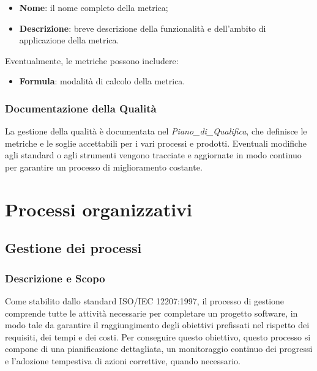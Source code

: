 \documentclass[10pt]{article}
\begin{document}
\begin{justify}
\begin{itemize}
    \item \textbf{Nome}: il nome completo della metrica;
    \item \textbf{Descrizione}: breve descrizione della funzionalità e dell'ambito di applicazione della metrica.
\end{itemize}

Eventualmente, le metriche possono includere:
\begin{itemize}
    \item \textbf{Formula}: modalità di calcolo della metrica.
\end{itemize}
    
    \subsubsection{Documentazione della Qualità}
    La gestione della qualità è documentata nel \textit{Piano\_di\_Qualifica}, che definisce le metriche e le soglie accettabili per i vari processi e prodotti. Eventuali modifiche agli standard o agli strumenti vengono tracciate e aggiornate in modo continuo per garantire un processo di miglioramento costante.

\newpage
\section{Processi organizzativi}
    \subsection{Gestione dei processi}

    \subsubsection{Descrizione e Scopo}
    Come stabilito dallo standard ISO/IEC 12207:1997, il processo di gestione comprende tutte le attività necessarie per completare un progetto software, in modo tale da garantire il raggiungimento degli obiettivi prefissati nel rispetto dei requisiti, dei tempi e dei costi. Per conseguire questo obiettivo, questo processo si compone di una pianificazione dettagliata, un monitoraggio continuo dei progressi e l'adozione tempestiva di azioni correttive, quando necessario.


\end{justify}
\end{document}
